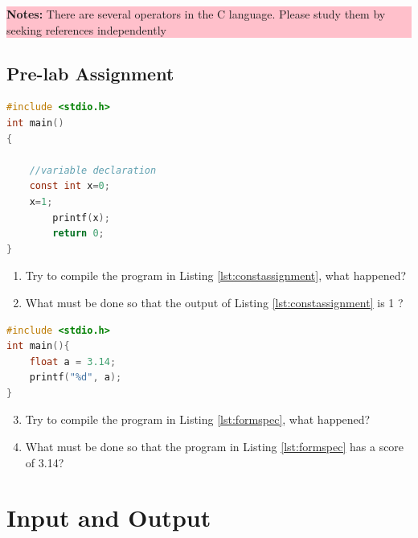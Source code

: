 \begin{center}
	\colorbox{pink}{\parbox{0.8\linewidth}{\textbf{Notes:} There are several operators in the C language. Please study them by seeking references independently}}
\end{center}

\subsection{Pre-lab Assignment}
\begin{lstlisting}[language=c,caption=Using assignment operator in a const variable,label=lst:constassignment,captionpos=t]
#include <stdio.h>
int main()
{

	//variable declaration
    const int x=0;
    x=1;
		printf(x);
		return 0;
}
\end{lstlisting}

\begin{enumerate}
	\item Try to compile the program in Listing \ref{lst:constassignment}, what happened?
	\item What must be done so that the output of Listing \ref{lst:constassignment} is 1 ?

\end{enumerate}
\begin{lstlisting}[language=c,caption=Using format specifier,label=lst:formspec,captionpos=t]
#include <stdio.h>
int main(){
    float a = 3.14;
    printf("%d", a);
}
\end{lstlisting}
\begin{enumerate}
	\setcounter{enumi}{2}
	\item Try to compile the program in Listing \ref{lst:formspec}, what happened?
	\item What must be done so that the program in Listing \ref{lst:formspec} has a score of 3.14?
\end{enumerate}

\section{Input and Output}

